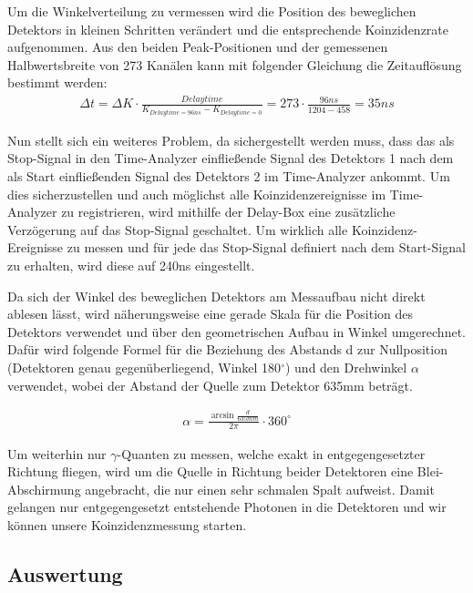 \documentclass[11pt]{scrartcl}
\begin{document}
Um die Winkelverteilung zu vermessen wird die Position des beweglichen Detektors in kleinen Schritten verändert und die entsprechende Koinzidenzrate aufgenommen. Aus den beiden Peak-Positionen und der gemessenen Halbwertsbreite von 273 Kanälen kann mit folgender Gleichung die Zeitauflösung bestimmt werden:
\begin{align}
\Delta t = \Delta K\cdot\frac{Delaytime}{K_{Delaytime=96ns} - K_{Delaytime=0}} = 273\cdot\frac{96ns}{1204-458}=35ns
\end{align}

Nun stellt sich ein weiteres Problem, da sichergestellt werden muss, dass das als Stop-Signal in den Time-Analyzer einfließende Signal des Detektors 1 nach dem als Start einfließenden Signal des Detektors 2 im Time-Analyzer ankommt. Um dies sicherzustellen und auch möglichst alle Koinzidenzereignisse im Time-Analyzer zu registrieren, wird mithilfe der Delay-Box eine zusätzliche Verzögerung auf das Stop-Signal geschaltet. Um wirklich alle Koinzidenz-Ereignisse zu messen und für jede das Stop-Signal definiert nach 
dem Start-Signal zu erhalten, wird diese auf 240ns eingestellt.

Da sich der Winkel des beweglichen Detektors am Messaufbau nicht direkt ablesen lässt, wird näherungsweise eine gerade Skala für die Position des Detektors verwendet und über den geometrischen Aufbau in Winkel umgerechnet. Dafür wird folgende Formel für die Beziehung des Abstands d zur Nullposition (Detektoren genau gegenüberliegend, Winkel 180$^\circ$) und den Drehwinkel $\alpha$ verwendet, wobei der Abstand der Quelle zum Detektor 635mm beträgt. 

\begin{align}
\alpha=\frac{\arcsin{\frac{d}{635mm}}}{2\pi}\cdot 360^\circ
\end{align}

Um weiterhin nur $\gamma$-Quanten zu messen, welche exakt in entgegengesetzter Richtung fliegen, wird um die Quelle in Richtung beider Detektoren eine Blei-Abschirmung angebracht, die nur einen sehr schmalen Spalt aufweist. Damit gelangen nur entgegengesetzt entstehende Photonen in die Detektoren und wir können unsere Koinzidenzmessung starten. 

\subsection{Auswertung}
\end{document}
